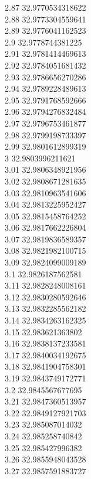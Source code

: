 {2.87	32.9770534318622\\
2.88	32.9773304559641\\
2.89	32.9776041162523\\
2.9	32.9778744381225\\
2.91	32.9781414469613\\
2.92	32.9784051681432\\
2.93	32.9786656270286\\
2.94	32.9789228489613\\
2.95	32.9791768592666\\
2.96	32.9794276832484\\
2.97	32.9796753461877\\
2.98	32.9799198733397\\
2.99	32.9801612899319\\
3	32.9803996211621\\
3.01	32.9806348921956\\
3.02	32.9808671281635\\
3.03	32.9810963541606\\
3.04	32.9813225952427\\
3.05	32.9815458764252\\
3.06	32.9817662226804\\
3.07	32.9819836589357\\
3.08	32.9821982100715\\
3.09	32.9824099009189\\
3.1	32.9826187562581\\
3.11	32.9828248008161\\
3.12	32.9830280592646\\
3.13	32.9832285562182\\
3.14	32.9834263162325\\
3.15	32.983621363802\\
3.16	32.9838137233581\\
3.17	32.9840034192675\\
3.18	32.9841904758301\\
3.19	32.9843749172771\\
3.2	32.9845567677695\\
3.21	32.9847360513957\\
3.22	32.9849127921703\\
3.23	32.985087014032\\
3.24	32.985258740842\\
3.25	32.985427996382\\
3.26	32.9855948043528\\
3.27	32.9857591883727\\
}
